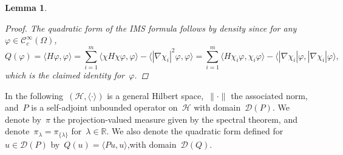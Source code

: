 \documentclass[10pt]{article}
\newcommand{\R}{\mathbb{R}}
\newcommand{\1}{\mathbbm 1}
\newtheorem{lemma}{Lemma}
\begin{document}
\begin{lemma}
\begin{proof}
            The quadratic form of the IMS formula follows by density since for any~$\varphi \in \mathcal C^\infty_c(\Omega)$,
           ~$$
            Q(\varphi) = \langle H\varphi,\varphi\rangle = \sum_{i=1}^m \langle \chi H \chi \varphi,\varphi\rangle - \langle |\nabla\chi_i|^2\varphi,\varphi\rangle = \sum_{i=1}^m \langle H\chi_i\varphi,\chi_i\varphi\rangle - \langle |\nabla \chi_i|\varphi,|\nabla\chi_i|\varphi\rangle,
           ~$$
            which is the claimed identity for~$\varphi$.
        \end{proof}

    \end{lemma}

    In the following~$(\mathcal H,\langle\cdot\rangle)$ is a general Hilbert space,~$\|\cdot\|$ the associated norm, and~$P$ is a self-adjoint unbounded operator on~$\mathcal H$ with domain~$\mathcal D(P)$. We denote by~$\pi$ the projection-valued measure given by the spectral theorem, and denote~$\pi_\lambda = \pi_{\{\lambda\}}$ for~$\lambda\in\R$.
    We also denote the quadratic form defined for~$u\in\mathcal D(P)$ by~$Q(u) = \langle Pu,u\rangle$,with domain~$\mathcal D(Q)$.
\end{document}
